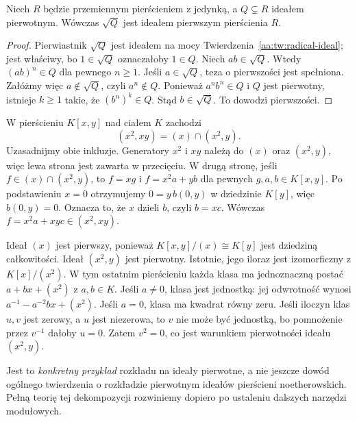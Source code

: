 \begin{lemat}
\label{aa:lem:primary-radical-prime}
Niech $R$ będzie przemiennym pierścieniem z jedynką,
a $Q\subsetneq R$ ideałem pierwotnym. Wówczas $\sqrt Q$
jest ideałem pierwszym pierścienia $R$.
\end{lemat}
\begin{proof}
Pierwiastnik $\sqrt Q$ jest ideałem na mocy
Twierdzenia~\ref{aa:tw:radical-ideal}; jest właściwy,
bo $1\in\sqrt Q$ oznaczałoby $1\in Q$.
Niech $ab\in\sqrt Q$. Wtedy $(ab)^n\in Q$
dla pewnego $n\ge1$. Jeśli $a\in\sqrt Q$, teza
o pierwszości jest spełniona. Załóżmy więc
$a\notin\sqrt Q$, czyli $a^n\notin Q$.
Ponieważ $a^n b^n\in Q$ i $Q$ jest pierwotny,
istnieje $k\ge1$ takie, że $(b^n)^k\in Q$.
Stąd $b\in\sqrt Q$. To dowodzi pierwszości.
\end{proof}

\begin{przyklad}
\label{aa:prz:primary-decomposition-explicit}
W pierścieniu $K[x,y]$ nad ciałem $K$ zachodzi
\[
 (x^2,xy)=(x)\cap(x^2,y).
\]
Uzasadnijmy obie inkluzje. Generatory $x^2$ i $xy$
należą do $(x)$ oraz $(x^2,y)$, więc lewa strona
jest zawarta w przecięciu. W drugą stronę, jeśli
$f\in(x)\cap(x^2,y)$, to $f=xg$ i
$f=x^2 a+yb$ dla pewnych $g,a,b\in K[x,y]$.
Po podstawieniu $x=0$ otrzymujemy
$0=y\,b(0,y)$ w dziedzinie $K[y]$, więc $b(0,y)=0$.
Oznacza to, że $x$ dzieli $b$, czyli $b=xc$.
Wówczas $f=x^2 a+xyc\in(x^2,xy)$.

Ideał $(x)$ jest pierwszy, ponieważ
$K[x,y]/(x)\cong K[y]$ jest dziedziną całkowitości.
Ideał $(x^2,y)$ jest pierwotny. Istotnie, jego iloraz
jest izomorficzny z $K[x]/(x^2)$. W tym ostatnim
pierścieniu każda klasa ma jednoznaczną postać
$a+bx+(x^2)$ z $a,b\in K$. Jeśli $a\ne0$, klasa
jest jednostką: jej odwrotność wynosi
$a^{-1}-a^{-2}bx+(x^2)$. Jeśli $a=0$, klasa ma
kwadrat równy zeru. Jeśli iloczyn klas $u,v$ jest zerowy,
a $u$ jest niezerowa, to $v$ nie może być jednostką,
bo pomnożenie przez $v^{-1}$ dałoby $u=0$.
Zatem $v^2=0$, co jest warunkiem pierwotności
ideału $(x^2,y)$.

Jest to \emph{konkretny przykład} rozkładu na ideały
pierwotne, a nie jeszcze dowód ogólnego twierdzenia
o rozkładzie pierwotnym ideałów pierścieni noetherowskich.
Pełną teorię tej dekompozycji rozwiniemy dopiero po
ustaleniu dalszych narzędzi modułowych.
\end{przyklad}
